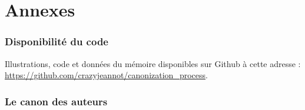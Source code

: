 \appendix
\part*{Annexes}
\pagestyle{myheadings}

\section{Disponibilité du code}\label{code}

Illustrations, code et données du mémoire disponibles sur Github à cette adresse : \url{https://github.com/crazyjeannot/canonization_process}. 


\newpage
\section{Le canon des auteurs}\label{canon_auteur}

